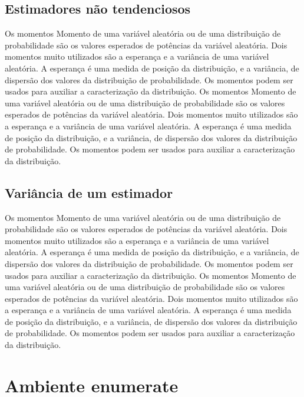 \documentclass[12pt]{article}
\begin{document}
\subsection{Estimadores não tendenciosos}
Os momentos Momento de uma variável aleatória ou de uma distribuição de probabilidade são os valores esperados de potências da variável aleatória. Dois momentos muito utilizados são a esperança e a variância de uma variável aleatória. A esperança é uma medida de posição da distribuição, e a variância, de dispersão dos valores da distribuição de probabilidade. Os momentos podem ser usados para auxiliar a caracterização da distribuição.
Os momentos Momento de uma variável aleatória ou de uma distribuição de probabilidade são os valores esperados de potências da variável aleatória. Dois momentos muito utilizados são a esperança e a variância de uma variável aleatória. A esperança é uma medida de posição da distribuição, e a variância, de dispersão dos valores da distribuição de probabilidade. Os momentos podem ser usados para auxiliar a caracterização da distribuição.


\subsection{Variância de um estimador}
Os momentos Momento de uma variável aleatória ou de uma distribuição de probabilidade são os valores esperados de potências da variável aleatória. Dois momentos muito utilizados são a esperança e a variância de uma variável aleatória. A esperança é uma medida de posição da distribuição, e a variância, de dispersão dos valores da distribuição de probabilidade. Os momentos podem ser usados para auxiliar a caracterização da distribuição.
Os momentos Momento de uma variável aleatória ou de uma distribuição de probabilidade são os valores esperados de potências da variável aleatória. Dois momentos muito utilizados são a esperança e a variância de uma variável aleatória. A esperança é uma medida de posição da distribuição, e a variância, de dispersão dos valores da distribuição de probabilidade. Os momentos podem ser usados para auxiliar a caracterização da distribuição.


\newpage 


\section{Ambiente enumerate}
\end{document}

